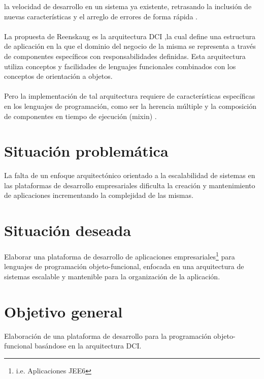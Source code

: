   la velocidad de desarrollo en un sistema ya existente, retrasando la inclusi\'on 
  de nuevas caracter\'isticas y el arreglo de errores de forma r\'apida 
  \citep{codeReadability}.
\\
\\
  La propuesta de Reenskaug es la arquitectura \gls{DCI} \citep{dciIntro}
  ,la cual define una
  estructura de aplicaci\'on en la que el dominio del negocio de la
  misma se representa a trav\'es de componentes espec\'ificos con
  responsabilidades definidas. Esta arquitectura utiliza conceptos y
  facilidades de lenguajes funcionales combinados con los conceptos de
  orientaci\'on a objetos.
\\
\\
  Pero la implementaci\'on de tal arquitectura requiere de caracter\'isticas
  espec\'ificas en los lenguajes de programaci\'on, como ser la herencia 
  m\'ultiple y la composici\'on de componentes en tiempo de ejecuci\'on (\gls{mixin}) 
  \citep{dciIntro}.

\section*{Situaci\'on problem\'atica}

  La falta de un enfoque arquitect\'onico orientado a la escalabilidad de sistemas en las
  plataformas de desarrollo empresariales dificulta la creaci\'on y mantenimiento 
  de aplicaciones incrementando la complejidad de las mismas. 

\section*{Situaci\'on deseada}

  Elaborar una plataforma de desarrollo de aplicaciones 
  empresariales\footnote{i.e. Aplicaciones \gls{JEE6}}
  para lenguajes de programaci\'on objeto-funcional, enfocada en una 
  arquitectura de sistemas escalable y mantenible para la organizaci\'on de la
  aplicaci\'on.

\section*{Objetivo general}

  Elaboraci\'on de una plataforma de desarrollo para la
  programaci\'on objeto-funcional bas\'andose en 
  la arquitectura \gls{DCI}.

